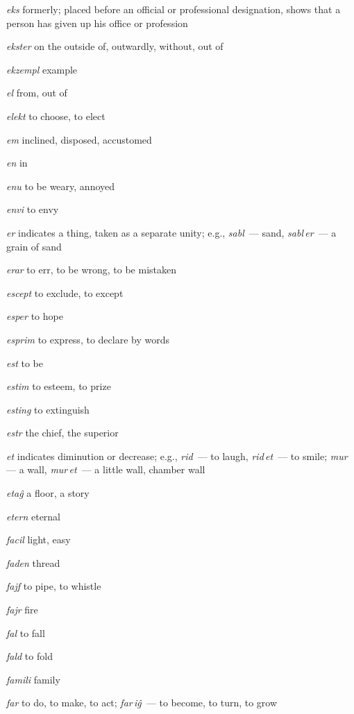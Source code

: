 \begin{landscape}
\begin{multicols}{5}
\begin{outdent}{1em}
\emph{eks}  formerly; placed before an official or professional designation, shows that a person has given up his office or profession

\emph{ekster}  on the outside of, outwardly, without, out of

\emph{ekzempl}  example

\emph{el}  from, out of

\emph{elekt}  to choose, to elect

\emph{em}  inclined, disposed, accustomed

\emph{en}  in

\emph{enu}  to be weary, annoyed

\emph{envi}  to envy

\emph{er}  indicates a thing, taken as a separate unity; e.g., \emph{sabl\,} — sand, \emph{sabl\,er\,} — a grain of sand

\emph{erar}  to err, to be wrong, to be mistaken

\emph{escept}  to exclude, to except

\emph{esper} to hope

\emph{esprim } to express, to declare by words

\emph{est}  to be

\emph{estim } to esteem, to prize

\emph{esting}  to extinguish

\emph{estr}  the chief, the superior

\emph{et } indicates diminution or decrease; e.g., \emph{rid\,} — to laugh, \emph{rid\,et\,} — to smile; \emph{mur\,} — a wall, \emph{mur\,et\,} — a little wall, chamber wall

\emph{etaĝ}  a floor, a story

\emph{etern}  eternal
\end{outdent}


\begin{outdent}{1em}
\emph{facil  }light, easy

\emph{faden}  thread

\emph{fajf}  to pipe, to whistle

\emph{fajr}  fire

\emph{fal}  to fall

\emph{fald}  to fold

\emph{famili}  family

\emph{far}  to do, to make, to act; \emph{far\,iĝ\,} — to become, to turn, to grow


\end{outdent}
\end{multicols}
\end{landscape}
